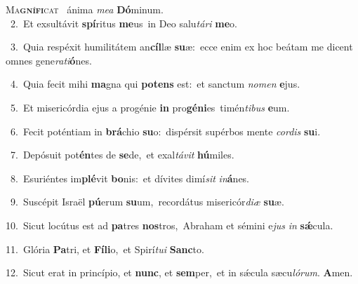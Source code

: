 \lettrine{\initial\textcolor{\initialcolor}{M}}{a\-\textbf{gní}\-\textbf{fi}cat~\star} ánima \textit{me}\-\textit{a} \textbf{Dó}\-minum.\\
{\numbfont\textcolor{\numbcolor}{~2.}}~Et exsultávit \textbf{spí}\-ritus \textbf{me}\-us~\star in Deo salu\-\textit{tá}\-\textit{ri} \textbf{me}\-o.\par
{\numbfont\textcolor{\numbcolor}{~3.}}~Quia respéxit humilitátem an\-\textbf{cíl}\-læ \textbf{su}\-æ:~\star ecce enim ex hoc beátam me dicent omnes gene\-\textit{ra}\-\textit{ti}\textbf{ó}nes.\par
{\numbfont\textcolor{\numbcolor}{~4.}}~Quia fecit mihi \textbf{ma}\-gna qui \textbf{pot}\-\textbf{ens} est:~\star et sanctum \textit{no}\-\textit{men} \textbf{e}\-jus.\par
{\numbfont\textcolor{\numbcolor}{~5.}}~Et misericórdia ejus a progénie \textbf{in} pro\-\textbf{gé}\-\textbf{ni}es~\star timén\-\textit{ti}\-\textit{bus} \textbf{e}\-um.\par
{\numbfont\textcolor{\numbcolor}{~6.}}~Fecit poténtiam in \textbf{brá}\-chio \textbf{su}\-o:~\star dispérsit supérbos mente \textit{cor}\-\textit{dis} \textbf{su}\-i.\par
{\numbfont\textcolor{\numbcolor}{~7.}}~Depósuit pot\-\textbf{én}\-tes de \textbf{se}\-de,~\star et exal\-\textit{tá}\-\textit{vit} \textbf{hú}\-miles.\par
{\numbfont\textcolor{\numbcolor}{~8.}}~Esuriéntes im\-\textbf{plé}\-vit \textbf{bo}\-nis:~\star et dívites dimí\textit{sit} \textit{in}\-\textbf{á}nes.\par
{\numbfont\textcolor{\numbcolor}{~9.}}~Suscépit Israël \textbf{pú}\-erum \textbf{su}\-um,~\star recordátus misericór\-\textit{di}\-\textit{æ} \textbf{su}\-æ.\par
{\numbfont\textcolor{\numbcolor}{10.}}~Sicut locútus est ad \textbf{pa}\-tres \textbf{nos}\-tros,~\star Abraham et sémini e\textit{jus} \textit{in} \textbf{sǽ}\-cula.\par
{\numbfont\textcolor{\numbcolor}{11.}}~Glória \textbf{Pa}\-tri, et \textbf{Fí}\-\textbf{li}o,~\star et Spirí\-\textit{tu}\-\textit{i} \textbf{Sanc}\-to.\par
{\numbfont\textcolor{\numbcolor}{12.}}~Sicut erat in princípio, et \textbf{nunc}\-, et \textbf{sem}\-per,~\star et in sǽcula sæcu\-\textit{ló}\-\textit{rum}. \textbf{A}\-men.\par
